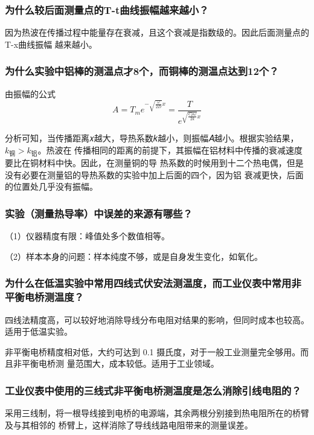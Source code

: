 \documentclass[11pt,a4paper]{article}
\begin{document}
    \subsubsection*{为什么较后面测量点的T-t曲线振幅越来越小？}
    因为热波在传播过程中能量存在衰减，且这个衰减是指数级的。因此后面测量点的T-x曲线振幅
    越来越小。

    \subsubsection*{为什么实验中铝棒的测温点才8个，而铜棒的测温点达到12个？}
    由振幅的公式
    \begin{equation}
        A = {T_m}{e^{ - \sqrt {\frac{\omega }{{2D}}} x}} = \frac{T}{{{e^{\sqrt {\frac{{C\rho \omega }}{{2k}}} x}}}}
    \end{equation}

    分析可知，当传播距离𝑥越大，导热系数𝑘越小，则振幅𝐴越小。根据实验结果，$k_{\mbox{铜}}>k_{\mbox{铝}}$。热波在
    传播相同的距离的前提下，其振幅在铝材料中传播的衰减速度要比在铜材料中快。因此，在测量铜的导
    热系数的时候用到十二个热电偶，但是没有必要在测量铝的导热系数的实验中加上后面的四个，因为铝
    衰减更快，后面的位置处几乎没有振幅。

    \subsubsection*{实验（测量热导率）中误差的来源有哪些？}
    （1）仪器精度有限：峰值处多个数值相等。

    （2）样本本身的问题：样本纯度不够，或是自身发生变化，如氧化。

    \subsubsection*{为什么在低温实验中常用四线式伏安法测温度，而工业仪表中常用非平衡电桥测温度？}
    四线法精度高，可以较好地消除导线分布电阻对结果的影响，但同时成本也较高。适用于低温实验。

    非平衡电桥精度相对低，大约可达到 0.1 摄氏度，对于一般工业测量完全够用。而且非平衡电桥测
    量范围大，成本较低。适用于工业领域。
    \subsubsection*{工业仪表中使用的三线式非平衡电桥测温度是怎么消除引线电阻的？}
    采用三线制，将一根导线接到电桥的电源端，其余两根分别接到热电阻所在的桥臂及与其相邻的
    桥臂上，这样消除了导线线路电阻带来的测量误差。
\end{document}
